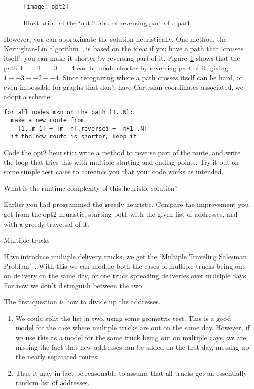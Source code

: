 \begin{figure}[ht]
  \texttt{[image: opt2]}
  \caption{Illustration of the `opt2' idea of reversing part of a
    path}
  \label{fig:opt2}
\end{figure}

However, you can approximate the solution heuristically. One method,
the Kernighan-Lin algorithm~\cite{KL:TSP}, is based on the
 idea: if you have a path that `crosses itself', you
can make it shorter by reversing part of it. Figure~\ref{fig:opt2}
shows that the path $1--2--3--4$ can be made shorter by reversing part
of it, giving $1--3--2--4$. Since recognizing where a path crosses
itself can be hard, or even impossible for graphs that don't have
Cartesian coordinates associated, we adopt a scheme:
\begin{verbatim}
for all nodes m<n on the path [1..N]:
  make a new route from
    [1..m-1] + [m--n].reversed + [n+1..N]
  if the new route is shorter, keep it
\end{verbatim}

\begin{exercise}
  Code the opt2 heuristic: write a method to reverse part of the
  route, and write the loop that tries this with multiple starting and
  ending points. Try it out on some simple test cases to convince you
  that your code works as intended.
\end{exercise}

\begin{exercise}
  What is the runtime complexity of this heuristic solution?
\end{exercise}

\begin{exercise}
  Earlier you had programmed the greedy heuristic. Compare the
  improvement you get from the opt2 heuristic, starting both with the
  given list of addresses, and with a greedy traversal of it.
\end{exercise}

 {Multiple trucks}

If we introduce multiple delivery trucks, we get the `Multiple
Traveling Salesman Problem'~\cite{Bektas:MTSP}.
With this we can module both the cases of multiple trucks being out on
delivery on the same day, or one truck spreading deliveries over
multiple days. For now we don't distinguish between the two.

The first question is how to divide up the addresses.
\begin{enumerate}
\item We could split the list in two, using some geometric test. This
  is a good model for the case where multiple trucks are out on the
  same day. However, if we use this as a model for the same truck
  being out on multiple days, we are missing the fact that new
  addresses can be added on the first day, messing up the neatly
  separated routes.
\item Thus it may in fact be reasonable to assume that all trucks get
  an essentially random list of addresses.
\end{enumerate}

